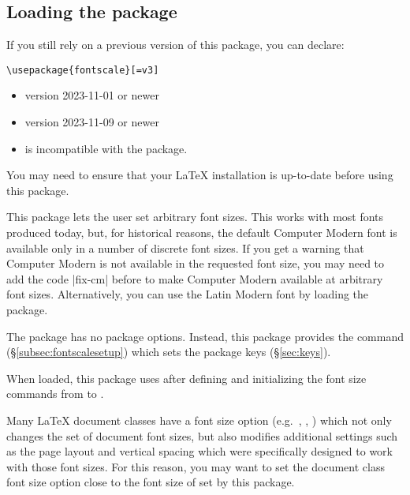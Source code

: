\documentclass{beery}
\begin{document}
\subsection{Loading the package}
\label{subsec:loading}

If you still rely on a previous version of this package, you can declare:

\begin{verbatim}
\usepackage{fontscale}[=v3]
\end{verbatim}

\begin{itemize}
  \item \LaTeXe{} version 2023-11-01 or newer
  \item {} version 2023-11-09 or newer
  \item {} is incompatible with the  package.
\end{itemize}

You may need to ensure that your \LaTeX{} installation is up-to-date before using this package.

This package lets the user set arbitrary font sizes.
This works with most fonts produced today, but, for historical reasons, the default Computer Modern font is available only in a number of discrete font sizes.
If you get a warning that Computer Modern is not available in the requested font size, you may need to add the code \allowbreak|{fix-cm}| before  to make Computer Modern available at arbitrary font sizes.
Alternatively, you can use the Latin Modern font by loading the  package.

The  package has no package options.
Instead, this package provides the command  (\S\ref{subsec:fontscalesetup}) which sets the package keys (\S\ref{sec:keys}).

When loaded, this package uses  after defining and initializing the font size commands from  to .

Many \LaTeX{} document classes have a font size option (e.g.\ \key{10pt}, \key{11pt}, \key{12pt}) which not only changes the set of document font sizes, but also modifies additional settings such as the page layout and vertical spacing which were specifically designed to work with those font sizes.
For this reason, you may want to set the document class font size option close to the font size of  set by this package.
\end{document}
